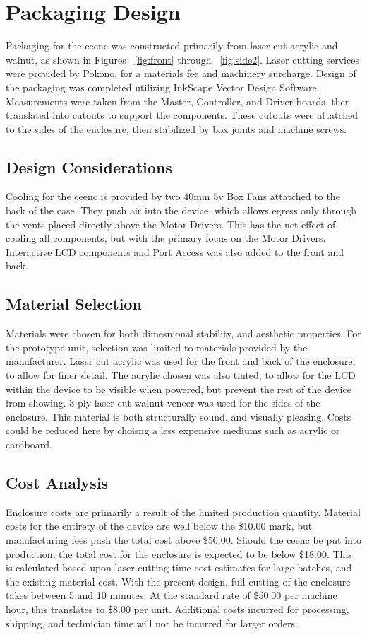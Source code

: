 \section{Packaging Design}
Packaging for the \gls{ceenc} was constructed primarily from laser cut acrylic and walnut, as shown in Figures ~\ref{fig:front} through ~\ref{fig:side2}. 
Laser cutting services were provided by Pokono, for a materials fee and machinery surcharge.
Design of the packaging was completed utilizing InkScape Vector Design Software.
Measurements were taken from the Master, Controller, and Driver boards, then translated into cutouts to support the components.
These cutouts were attatched to the sides of the enclosure, then stabilized by box joints and machine screws.

\subsection{Design Considerations}
Cooling for the \gls{ceenc} is provided by two 40mm 5v Box Fans attatched to the back of the case.
They push air into the device, which allows egress only through the vents placed directly above the Motor Drivers.
This has the net effect of cooling all components, but with the primary focus on the Motor Drivers.
Interactive LCD components and Port Access was also added to the front and back.

\subsection{Material Selection}
Materials were chosen for both dimesnional stability, and aesthetic properties.
For the prototype unit, selection was limited to materials provided by the manufacturer.
Laser cut acrylic was used for the front and back of the enclosure, to allow for finer detail.
The acrylic chosen was also tinted, to allow for the LCD within the device to be visible when powered, but prevent the rest of the device from showing.
3-ply laser cut walnut veneer was used for the sides of the enclosure.
This material is both structurally sound, and visually pleasing. 
Costs could be reduced here by choisng a less expensive mediums such as acrylic or cardboard.

\subsection{Cost Analysis}
Enclosure costs are primarily a result of the limited production quantity. 
Material costs for the entirety of the device are well below the \$10.00 mark, but manufacturing fees push the total cost above \$50.00.
Should the \gls{ceenc} be put into production, the total cost for the enclosure is expected to be below \$18.00.
This is calculated based upon laser cutting time cost estimates for large batches, and the existing material cost.
With the present design, full cutting of the enclosure takes between 5 and 10 minutes.
At the standard rate of \$50.00 per machine hour, this translates to \$8.00 per unit.
Additional costs incurred for processing, shipping, and technician time will not be incurred for larger orders.


